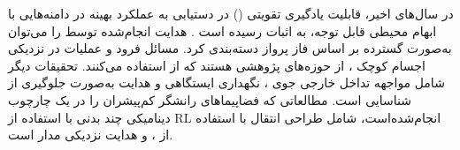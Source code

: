
در سال‌های اخیر، قابلیت یادگیری تقویتی () در دستیابی به عملکرد بهینه در دامنه‌هایی با ابهام محیطی قابل توجه، به اثبات رسیده است  \cite{heess2017emergence, silver2017mastering}.
هدایت انجام‌شده توسط  را می‌توان به‌صورت گسترده بر اساس فاز پرواز دسته‌بندی کرد.
مسائل فرود \cite{furfaro2020adaptive, gaudet2020deep} 
و عملیات در نزدیکی اجسام کوچک
\cite{gaudet2020terminal, gaudet2020six}،
از حوزه‌های پژوهشی هستند که از  استفاده می‌کنند.
تحقیقات دیگر شامل مواجهه تداخل خارجی جوی \cite{gaudet2020reinforcement}،
نگهداری ایستگاهی \cite{guzzetti2019reinforcement}  و هدایت به‌صورت جلوگیری از شناسایی \cite{reiter2020augmenting} است.
مطالعاتی که فضاپیماهای رانشگر کم‌پیشران را در یک چارچوب دینامیکی چند بدنی با استفاده از RL انجام‌شده‌است، شامل طراحی انتقال با استفاده از  
\cite{dasstuart2020rapid}، 
\cite{miller2019lowthrust}
و  هدایت نزدیکی مدار  \cite{sullivan2020using} است.